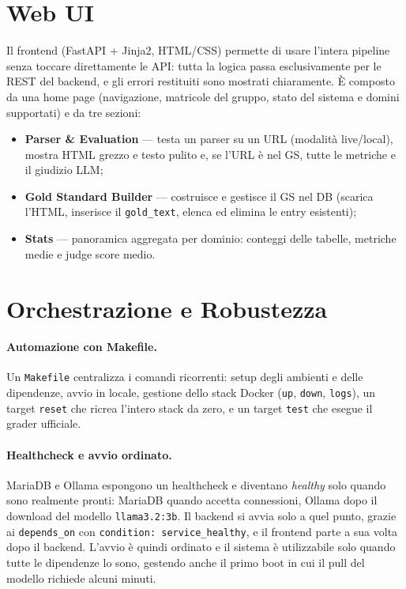 \documentclass[11pt]{article}
\begin{document}

\section{Web UI}

Il frontend (FastAPI + Jinja2, HTML/CSS) permette di usare l'intera pipeline senza toccare direttamente le API: tutta la logica passa esclusivamente per le REST del backend, e gli errori restituiti sono mostrati chiaramente. È composto da una home page (navigazione, matricole del gruppo, stato del sistema e domini supportati) e da tre sezioni:

\begin{itemize}
  \item \textbf{Parser \& Evaluation} — testa un parser su un URL (modalità live/local), mostra HTML grezzo e testo pulito e, se l'URL è nel GS, tutte le metriche e il giudizio LLM;
  \item \textbf{Gold Standard Builder} — costruisce e gestisce il GS nel DB (scarica l'HTML, inserisce il \texttt{gold\_text}, elenca ed elimina le entry esistenti);
  \item \textbf{Stats} — panoramica aggregata per dominio: conteggi delle tabelle, metriche medie e judge score medio.
\end{itemize}


\section{Orchestrazione e Robustezza}

\paragraph{Automazione con Makefile.} Un \texttt{Makefile} centralizza i comandi ricorrenti: setup degli ambienti e delle dipendenze, avvio in locale, gestione dello stack Docker (\texttt{up}, \texttt{down}, \texttt{logs}), un target \texttt{reset} che ricrea l'intero stack da zero, e un target \texttt{test} che esegue il grader ufficiale.

\paragraph{Healthcheck e avvio ordinato.} MariaDB e Ollama espongono un healthcheck e diventano \emph{healthy} solo quando sono realmente pronti: MariaDB quando accetta connessioni, Ollama dopo il download del modello \texttt{llama3.2:3b}. Il backend si avvia solo a quel punto, grazie ai \texttt{depends\_on} con \texttt{condition:\ service\_healthy}, e il frontend parte a sua volta dopo il backend. L'avvio è quindi ordinato e il sistema è utilizzabile solo quando tutte le dipendenze lo sono, gestendo anche il primo boot in cui il pull del modello richiede alcuni minuti.
\end{document}
